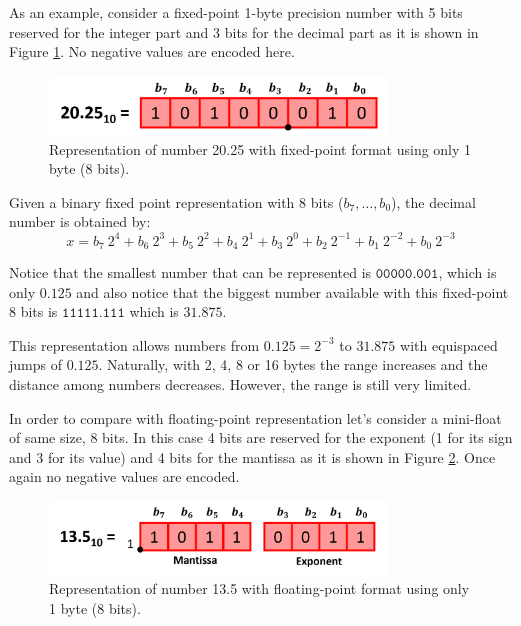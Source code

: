  
 
 
 
As an example, 
consider a fixed-point 1-byte precision number with 5 bits reserved for the integer part and 3 bits
for the decimal part as it is shown in Figure \ref{fig:FixedFloat2}. No negative values are encoded here. 

\begin{figure}[h]
    \centering
    \includegraphics[width= 0.8\textwidth]{./doc/Figures/FixedFloat3.png}
    \caption{Representation of number 20.25 with fixed-point format using only 1 byte (8 bits).}
    \label{fig:FixedFloat2}
\end{figure}

Given a binary fixed point representation with 8 bits ($b_7, \ldots, b_0$), the decimal number is obtained by: 
$$
   x = b_7 \ 2^4 + b_6 \ 2^3 + b_5 \ 2^2  + b_4 \ 2^1 + b_3 \ 2^0 + b_2 \ 2^{-1}  + b_1 \ 2^{-2} + b_0 \ 2^{-3}
$$

Notice that the smallest number that can be represented is
$\texttt{00000.001}$, which is only $0.125$ 
and also notice that the biggest number available with this fixed-point 8 bits is $\texttt{11111.111}$
which is $31.875$.

This representation allows numbers from $0.125 = 2^{-3}$ to $31.875$ with equispaced jumps of $0.125$. 
Naturally, with 2, 4, 8 or 16 bytes the range increases 
and the distance among numbers decreases. However, the range is still very limited. 





In order to compare with floating-point representation
let's consider a mini-float of same size, 8 bits.
In this case 4 bits are reserved for the exponent (1 for its sign and 3 for its value) 
and 4 bits for the mantissa as it is shown in Figure \ref{fig:FloatFloat}. 
Once again no negative values are encoded.

\begin{figure}[h]
    \centering
    \includegraphics[width= 0.8\textwidth]{./doc/Figures/FloatFloat2.png}
    \caption{Representation of number 13.5 with floating-point format using only 1 byte (8 bits).}
    \label{fig:FloatFloat}
\end{figure}

